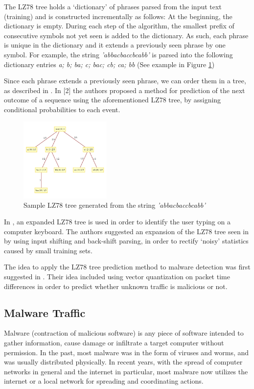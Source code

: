 \documentclass[9pt,journal,compsoc]{IEEEtran}
\begin{document}
The LZ78 tree holds a ‘dictionary’ of phrases parsed from the input text (training) and is constructed incrementally as follows:
At the beginning, the dictionary is empty. During each step of the algorithm, the smallest prefix of consecutive symbols not yet seen is added to the dictionary. As such, each phrase is unique in the dictionary and it extends a previously seen phrase by one symbol.
For example, the string \emph{'abbacbaccbcabb'} is parsed into the following dictionary entries \emph{a; b; ba; c; bac; cb; ca; bb} (See example in Figure \ref{fig:lztree})

Since each phrase extends a previously seen phrase, we can order them in a tree, as described in \cite{Lan83}. In [2] the authors proposed a method for prediction of the next outcome of a sequence using the aforementioned LZ78 tree, by assigning conditional probabilities to each event.
\begin{figure}[!ht]
 \centering
 \includegraphics[width=0.40\textwidth]{sampletree.pdf}
 \caption{Sample LZ78 tree generated from the string \emph{'abbacbaccbcabb'}\label{fig:lztree}}
\end{figure} 
In \cite{Nis03}, an expanded LZ78 tree is used in order to identify the user typing on a computer keyboard. The authors suggested an expansion of the LZ78 tree seen in \cite{Lan83} by using input shifting and back-shift parsing, in order to rectify ‘noisy’ statistics caused by small training sets.

The idea to apply the LZ78 tree prediction method to malware detection was first suggested in \cite{Coh12}. Their idea included using vector quantization on packet time differences in order to predict whether unknown traffic is malicious or not.


\subsection{Malware Traffic}
\label{sec:malwaretraffic}
Malware (contraction of malicious software) is any piece of software intended to gather information, cause damage or infiltrate a target computer without permission.
In the past, most malware was in the form of viruses and worms, and was usually distributed physically. In recent years, with the spread of computer networks in general and the internet in particular, most malware now utilizes the internet or a local network for spreading and coordinating actions.
\end{document}
